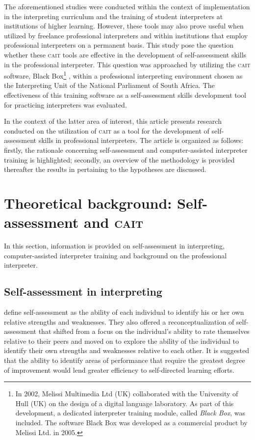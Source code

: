 \documentclass[output=paper]{langsci/langscibook}
\begin{document}
The aforementioned studies were conducted within the context of implementation in the interpreting curriculum and the training of student interpreters at institutions of higher learning. However, these tools may also prove useful when utilized by freelance professional interpreters and within institutions that employ professional interpreters on a permanent basis. This study pose the question whether these \textsc{cait} tools are effective in the development of self-assessment skills in the professional interpreter. This question was approached by utilizing the \textsc{cait} software, Black Box\footnote{In 2002, Melissi Multimedia Ltd (UK) collaborated with the University of Hull (UK) on the design of a digital language laboratory. As part of this development, a dedicated interpreter training module, called \textit{Black Box}, was included. The software Black Box was developed as a commercial product by Melissi Ltd. in 2005.} , within a professional interpreting environment chosen as the Interpreting Unit of the National Parliament of South Africa. The effectiveness of this training software as a self-assessment skills development tool for practicing interpreters was evaluated. 

In the context of the latter area of interest, this article presents research conducted on the utilization of \textsc{cait} as a tool for the development of self-assessment skills in professional interpreters. The article is organized as follows: firstly, the rationale concerning self-assessment and computer-assisted interpreter training is highlighted; secondly, an overview of the methodology is provided thereafter the results in pertaining to the hypotheses are discussed.

\section{Theoretical background: Self-assessment and \textsc{cait}}

In this section, information is provided on self-assessment in interpreting, computer-assisted interpreter training and background on the professional interpreter.

\subsection{Self-assessment in interpreting}

\citet[74]{Regehr1996} define self-assessment as the ability of each individual to identify his or her own relative strengths and weaknesses. They also offered a reconceptualization of self-assessment that shifted from a focus on the individual’s ability to rate themselves relative to their peers and moved on to explore the ability of the individual to identify their own strengths and weaknesses relative to each other. It is suggested that the ability to identify areas of performance that require the greatest degree of improvement would lend greater efficiency to self-directed learning efforts.
\end{document}
